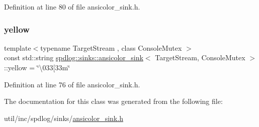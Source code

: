 Definition at line 80 of file ansicolor\+\_\+sink.\+h.

\mbox{\label{classspdlog_1_1sinks_1_1ansicolor__sink_a2677f9c054be6ae2a2e673a92ba27189}} 
\subsubsection{\texorpdfstring{yellow}{yellow}}
{\footnotesize\ttfamily template$<$typename Target\+Stream , class Console\+Mutex $>$ \\
const std\+::string \hyperlink{classspdlog_1_1sinks_1_1ansicolor__sink}{spdlog\+::sinks\+::ansicolor\+\_\+sink}$<$ Target\+Stream, Console\+Mutex $>$\+::yellow = \char`\"{}\textbackslash{}033\mbox{[}33m\char`\"{}}



Definition at line 76 of file ansicolor\+\_\+sink.\+h.



The documentation for this class was generated from the following file\+:\begin{DoxyCompactItemize}
\item 
util/inc/spdlog/sinks/\hyperlink{ansicolor__sink_8h}{ansicolor\+\_\+sink.\+h}\end{DoxyCompactItemize}
